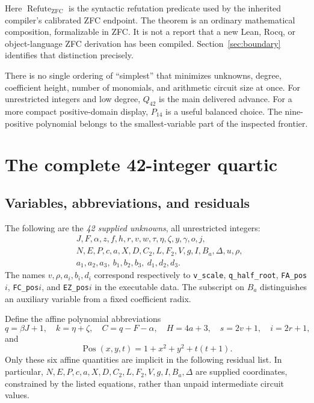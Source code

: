 \documentclass[11pt,a4paper]{article}
\theoremstyle{remark}\newtheorem{remark}[theorem]{Remark}
\newcommand{\ZFC}{\mathrm{ZFC}}
\newcommand{\Pos}{\operatorname{Pos}}
\newcommand{\refute}{\operatorname{Refute}_{\ZFC}}
\begin{document}
Here $\refute$ is the syntactic refutation predicate used by the inherited
compiler's calibrated ZFC endpoint. The theorem is an ordinary mathematical
composition, formalizable in ZFC. It is not a report that a new Lean, Rocq,
or object-language ZFC derivation has been compiled. Section~\ref{sec:boundary}
identifies that distinction precisely.

There is no single ordering of ``simplest'' that minimizes unknowns, degree,
coefficient height, number of monomials, and arithmetic circuit size at once.
For unrestricted integers and low degree, $Q_{42}$ is the main delivered
advance. For a more compact positive-domain display, $P_{14}$ is a useful
balanced choice. The nine-positive polynomial belongs to the smallest-variable
part of the inspected frontier.

\section{The complete 42-integer quartic}
\label{sec:quartic}

\subsection{Variables, abbreviations, and residuals}

The following are the \emph{42 supplied unknowns}, all unrestricted integers:
\begin{align*}
&J,F,\alpha,z,f,h,r,v,w,\tau,\eta,\zeta,y,\gamma,o,j,\\
&N,E,P,c,a,X,D,C_2,L,F_2,V,g,I,B_{\!a},\Delta,u,\rho,\\
&a_1,a_2,a_3,\ b_1,b_2,b_3,\ d_1,d_2,d_3.
\end{align*}
The names $v,\rho,a_i,b_i,d_i$ correspond respectively to
\texttt{v\_scale}, \texttt{q\_half\_root},
\texttt{FA\_pos}$i$, \texttt{FC\_pos}$i$, and
\texttt{EZ\_pos}$i$ in the executable data. The subscript on $B_{\!a}$
distinguishes an auxiliary variable from a fixed coefficient radix.

Define the affine polynomial abbreviations
\[
 q=\beta J+1,\quad k=\eta+\zeta,\quad C=q-F-\alpha,
 \quad H=4a+3,\quad s=2v+1,\quad i=2r+1,
\]
and
\[
 \Pos(x,y,t)=1+x^2+y^2+t(t+1).
\]
Only these six affine quantities are implicit in the following residual
list. In particular, $N,E,P,c,a,X,D,C_2,L,F_2,V,g,I,B_a,\Delta$
are supplied coordinates, constrained by the listed equations, rather than
unpaid intermediate circuit values.
\end{document}
